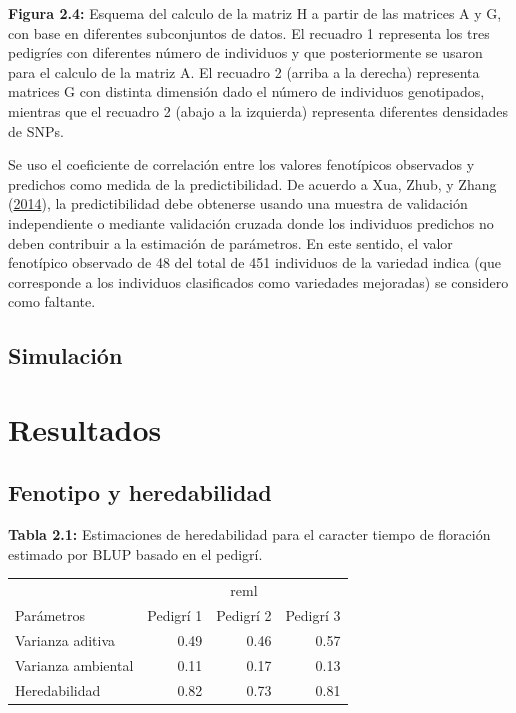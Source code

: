 \documentclass[11pt,spanish,a4paper,oneside,]{book} %
\begin{document}
\begin{center}
\textbf{Figura 2.4:} Esquema del calculo de la matriz H a partir de las matrices A y G, con base en diferentes subconjuntos de datos. El recuadro 1 representa los tres pedigríes con diferentes número de individuos y que posteriormente se usaron para el calculo de la matriz A. El recuadro 2 (arriba a la derecha) representa matrices G con distinta dimensión dado el número de individuos genotipados, mientras que el recuadro 2 (abajo a la izquierda) representa diferentes densidades de SNPs.

\end{center}

Se uso el coeficiente de correlación entre los valores fenotípicos observados y predichos como medida de la predictibilidad. De acuerdo a Xua, Zhub, y Zhang (\protect\hyperlink{ref-cite:25}{2014}), la predictibilidad debe obtenerse usando una muestra de validación independiente o mediante validación cruzada donde los individuos predichos no deben contribuir a la estimación de parámetros. En este sentido, el valor fenotípico observado de 48 del total de 451 individuos de la variedad indica (que corresponde a los individuos clasificados como variedades mejoradas) se considero como faltante.

\hypertarget{simulaciuxf3n}{%
\subsection{Simulación}\label{simulaciuxf3n}}

\hypertarget{results2}{%
\section{Resultados}\label{results2}}

\hypertarget{fenotipo-y-heredabilidad}{%
\subsection{Fenotipo y heredabilidad}\label{fenotipo-y-heredabilidad}}

\begin{center}
\textbf{Tabla 2.1:} Estimaciones de heredabilidad para el caracter tiempo de floración estimado por BLUP basado en el pedigrí.

\end{center}

\captionsetup[table]{labelformat=empty,skip=1pt}
\begin{longtable}{lrrr}
\toprule
 & \multicolumn{3}{c}{reml} \\ 
 \cmidrule(lr){2-4}
Parámetros & Pedigrí 1 & Pedigrí 2 & Pedigrí 3 \\ 
\midrule
Varianza aditiva & 0.49 & 0.46 & 0.57 \\ 
Varianza ambiental & 0.11 & 0.17 & 0.13 \\ 
Heredabilidad & 0.82 & 0.73 & 0.81 \\ 
 \bottomrule
\end{longtable}
\end{document}
